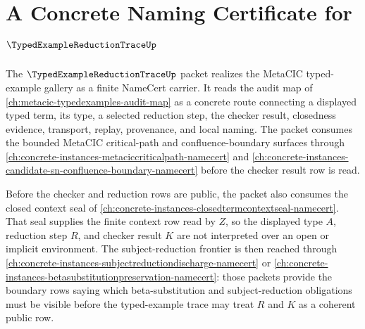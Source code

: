 \chapter{A Concrete Naming Certificate for $\TypedExampleReductionTraceUp$}
\label{ch:concrete-instances-typed-example-reduction-trace-namecert}

The $\TypedExampleReductionTraceUp$ packet realizes the MetaCIC typed-example gallery as a finite NameCert carrier. It reads the audit map of \autoref{ch:metacic-typedexamples-audit-map} as a concrete route connecting a displayed typed term, its type, a selected reduction step, the checker result, closedness evidence, transport, replay, provenance, and local naming. The packet consumes the bounded MetaCIC critical-path and confluence-boundary surfaces through \autoref{ch:concrete-instances-metaciccriticalpath-namecert} and \autoref{ch:concrete-instances-candidate-sn-confluence-boundary-namecert} before the checker result row is read.

Before the checker and reduction rows are public, the packet also consumes the closed context seal of \autoref{ch:concrete-instances-closedtermcontextseal-namecert}. That seal supplies the finite context row read by $Z$, so the displayed type $A$, reduction step $R$, and checker result $K$ are not interpreted over an open or implicit environment. The subject-reduction frontier is then reached through \autoref{ch:concrete-instances-subjectreductiondischarge-namecert} or \autoref{ch:concrete-instances-betasubstitutionpreservation-namecert}: those packets provide the boundary rows saying which beta-substitution and subject-reduction obligations must be visible before the typed-example trace may treat $R$ and $K$ as a coherent public row.

